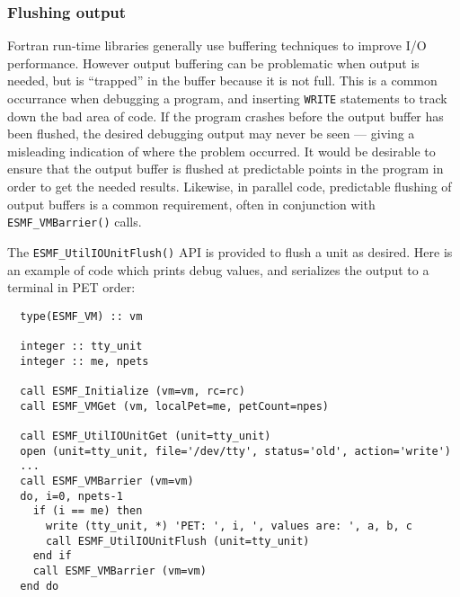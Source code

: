 \subsubsection{Flushing output}

Fortran run-time libraries generally use buffering techniques to improve I/O
performance.  However output buffering can be problematic when output is needed,
but is ``trapped'' in the buffer because it is not full.
This is a common occurrance when debugging a program, and inserting {\tt WRITE} statements
to track down the bad area of code.  If the program crashes before the output
buffer has been flushed, the desired debugging output may never be seen --- giving
a misleading indication of where the problem occurred.  It would be desirable
to ensure that the output buffer is flushed at predictable
points in the program in order to get the needed results.
Likewise, in parallel code, predictable flushing of output buffers is a common
requirement, often in conjunction with {\tt ESMF\_VMBarrier()} calls.  

The {\tt ESMF\_UtilIOUnitFlush()} API is provided to flush a unit as desired.  Here is
an example of code which prints debug values, and serializes the output to a
terminal in PET order:

\begin{verbatim}
  type(ESMF_VM) :: vm

  integer :: tty_unit
  integer :: me, npets

  call ESMF_Initialize (vm=vm, rc=rc)
  call ESMF_VMGet (vm, localPet=me, petCount=npes)

  call ESMF_UtilIOUnitGet (unit=tty_unit)
  open (unit=tty_unit, file='/dev/tty', status='old', action='write')
  ...
  call ESMF_VMBarrier (vm=vm)
  do, i=0, npets-1
    if (i == me) then
      write (tty_unit, *) 'PET: ', i, ', values are: ', a, b, c
      call ESMF_UtilIOUnitFlush (unit=tty_unit)
    end if
    call ESMF_VMBarrier (vm=vm)
  end do
\end{verbatim}

